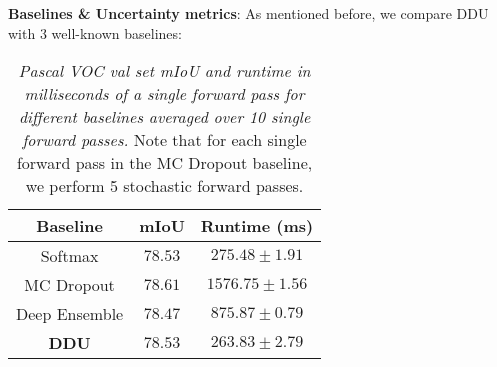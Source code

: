 \documentclass{article}
\begin{document}
\textbf{Baselines \& Uncertainty metrics}: As mentioned before, we compare DDU with 3 well-known baselines:

\begin{table}[t!]
    \centering
    \begin{tabular}{c|c|c}
        \toprule
        \textbf{Baseline} & \textbf{mIoU} & \textbf{Runtime (ms)} \\
        \midrule
        Softmax & $78.53$ & $275.48\pm1.91$ \\
        MC Dropout & $78.61$ & $1576.75\pm1.56$ \\
        Deep Ensemble & $78.47$ & $875.87\pm0.79$ \\
        \textbf{DDU} & $78.53$ & $\mathbf{263.83\pm2.79}$ \\
        \bottomrule
    \end{tabular}
    \caption{\emph{Pascal VOC val set mIoU and runtime in milliseconds of a single forward pass for different baselines averaged over 10 single forward passes.} Note that for each single forward pass in the MC Dropout baseline, we perform 5 stochastic forward passes.}
    \label{tab:runtime}
\end{table}
\end{document}
